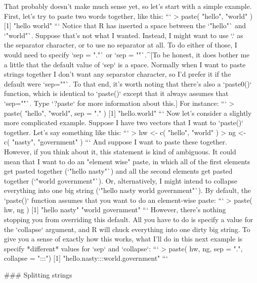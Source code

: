 That probably doesn't make much sense yet, so let's start with a simple example. First, let's try to paste two words together, like this:
```
> paste( "hello", "world" )
[1] "hello world"
```
Notice that R has inserted a space between the `"hello"` and `"world"`. Suppose that's not what I wanted. Instead, I might want to use `.` as the separator character, or to use no separator at all. To do either of those, I would need to specify `sep = "."` or `sep = ""`.^[To be honest, it does bother me a little that the default value of `sep` is a space. Normally when I want to paste strings together I don't want any separator character, so I'd prefer it if the default were `sep=""`. To that end, it's worth noting that there's also a `paste0()` function, which is identical to `paste()` except that it always assumes that `sep=""`. Type `?paste` for more information about this.] For instance:
```
> paste( "hello", "world", sep = "." )
[1] "hello.world"
```
Now let's consider a slightly more complicated example. Suppose I have two vectors that I want to `paste()` together. Let's say something like this:
```
> hw <- c( "hello", "world" )
> ng <- c( "nasty", "government" )
```
And suppose I want to paste these together. However, if you think about it, this statement is kind of ambiguous. It could mean that I want to do an "element wise" paste, in which all of the first elements get pasted together (`"hello nasty"`) and all the second elements get pasted together (`"world government"`). Or, alternatively, I might intend to collapse everything into one big string (`"hello nasty world government"`). By default, the `paste()` function assumes that you want to do an element-wise paste:
```
> paste( hw, ng )
[1] "hello nasty"      "world government"
```
However, there's nothing stopping you from overriding this default. All you have to do is specify a value for the `collapse` argument, and R will chuck everything into one dirty big string. To give you a sense of exactly how this works, what I'll do in this next example is specify *different* values for `sep` and `collapse`:
```
> paste( hw, ng, sep = ".", collapse = ":::")
[1] "hello.nasty:::world.government"
```



### Splitting strings

